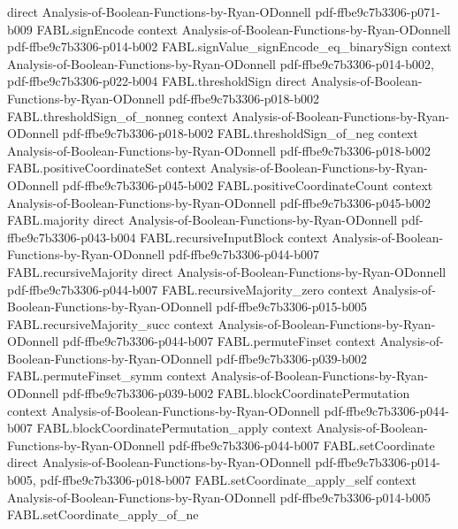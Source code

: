 \begin{theorem}
  {direct}
  {Analysis-of-Boolean-Functions-by-Ryan-ODonnell}
  {pdf-ffbe9c7b3306-p071-b009}
\proofstep
  {FABL.signEncode}
  {context}
  {Analysis-of-Boolean-Functions-by-Ryan-ODonnell}
  {pdf-ffbe9c7b3306-p014-b002}
\proofstep
  {FABL.signValue_signEncode_eq_binarySign}
  {context}
  {Analysis-of-Boolean-Functions-by-Ryan-ODonnell}
  {pdf-ffbe9c7b3306-p014-b002,
    pdf-ffbe9c7b3306-p022-b004}
\proofstep
  {FABL.thresholdSign}
  {direct}
  {Analysis-of-Boolean-Functions-by-Ryan-ODonnell}
  {pdf-ffbe9c7b3306-p018-b002}
\proofstep
  {FABL.thresholdSign_of_nonneg}
  {context}
  {Analysis-of-Boolean-Functions-by-Ryan-ODonnell}
  {pdf-ffbe9c7b3306-p018-b002}
\proofstep
  {FABL.thresholdSign_of_neg}
  {context}
  {Analysis-of-Boolean-Functions-by-Ryan-ODonnell}
  {pdf-ffbe9c7b3306-p018-b002}
\proofstep
  {FABL.positiveCoordinateSet}
  {context}
  {Analysis-of-Boolean-Functions-by-Ryan-ODonnell}
  {pdf-ffbe9c7b3306-p045-b002}
\proofstep
  {FABL.positiveCoordinateCount}
  {context}
  {Analysis-of-Boolean-Functions-by-Ryan-ODonnell}
  {pdf-ffbe9c7b3306-p045-b002}
\proofstep
  {FABL.majority}
  {direct}
  {Analysis-of-Boolean-Functions-by-Ryan-ODonnell}
  {pdf-ffbe9c7b3306-p043-b004}
\proofstep
  {FABL.recursiveInputBlock}
  {context}
  {Analysis-of-Boolean-Functions-by-Ryan-ODonnell}
  {pdf-ffbe9c7b3306-p044-b007}
\proofstep
  {FABL.recursiveMajority}
  {direct}
  {Analysis-of-Boolean-Functions-by-Ryan-ODonnell}
  {pdf-ffbe9c7b3306-p044-b007}
\proofstep
  {FABL.recursiveMajority_zero}
  {context}
  {Analysis-of-Boolean-Functions-by-Ryan-ODonnell}
  {pdf-ffbe9c7b3306-p015-b005}
\proofstep
  {FABL.recursiveMajority_succ}
  {context}
  {Analysis-of-Boolean-Functions-by-Ryan-ODonnell}
  {pdf-ffbe9c7b3306-p044-b007}
\proofstep
  {FABL.permuteFinset}
  {context}
  {Analysis-of-Boolean-Functions-by-Ryan-ODonnell}
  {pdf-ffbe9c7b3306-p039-b002}
\proofstep
  {FABL.permuteFinset_symm}
  {context}
  {Analysis-of-Boolean-Functions-by-Ryan-ODonnell}
  {pdf-ffbe9c7b3306-p039-b002}
\proofstep
  {FABL.blockCoordinatePermutation}
  {context}
  {Analysis-of-Boolean-Functions-by-Ryan-ODonnell}
  {pdf-ffbe9c7b3306-p044-b007}
\proofstep
  {FABL.blockCoordinatePermutation_apply}
  {context}
  {Analysis-of-Boolean-Functions-by-Ryan-ODonnell}
  {pdf-ffbe9c7b3306-p044-b007}
\proofstep
  {FABL.setCoordinate}
  {direct}
  {Analysis-of-Boolean-Functions-by-Ryan-ODonnell}
  {pdf-ffbe9c7b3306-p014-b005,
    pdf-ffbe9c7b3306-p018-b007}
\proofstep
  {FABL.setCoordinate_apply_self}
  {context}
  {Analysis-of-Boolean-Functions-by-Ryan-ODonnell}
  {pdf-ffbe9c7b3306-p014-b005}
\proofstep
  {FABL.setCoordinate_apply_of_ne}

\end{theorem}
